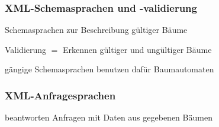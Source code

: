     \begin{frame}
      \frametitle{XML-Schemasprachen und -validierung}
      
      \begin{Itemize}
        \item
          Schemasprachen zur Beschreibung gültiger Bäume
        \item
          Validierung $=$ Erkennen gültiger und ungültiger Bäume
        \item
          gängige Schemasprachen benutzen dafür Baumautomaten
      \end{Itemize}
      
      \par\bigskip

    \end{frame}

    \begin{frame}
      \frametitle{XML-Anfragesprachen}
      
      \begin{Itemize}
        \item
          beantworten Anfragen mit Daten aus gegebenen Bäumen
      \end{Itemize}

      \par\bigskip

    \end{frame}

